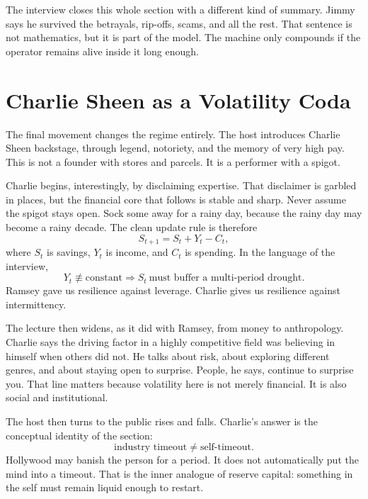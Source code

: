 The interview closes this whole section with a different kind of summary. Jimmy says he survived the betrayals, rip-offs, scams, and all the rest. That sentence is not mathematics, but it is part of the model. The machine only compounds if the operator remains alive inside it long enough.

\section{Charlie Sheen as a Volatility Coda}

The final movement changes the regime entirely. The host introduces Charlie Sheen backstage, through legend, notoriety, and the memory of very high pay. This is not a founder with stores and parcels. It is a performer with a spigot.

Charlie begins, interestingly, by disclaiming expertise. That disclaimer is garbled in places, but the financial core that follows is stable and sharp. Never assume the spigot stays open. Sock some away for a rainy day, because the rainy day may become a rainy decade. The clean update rule is therefore
\begin{equation}
S_{t+1}=S_t+Y_t-C_t,
\end{equation}
where \(S_t\) is savings, \(Y_t\) is income, and \(C_t\) is spending. In the language of the interview,
\begin{equation}
Y_t \not\equiv \text{constant} \Rightarrow S_t\ \text{must buffer a multi-period drought}.
\end{equation}
Ramsey gave us resilience against leverage. Charlie gives us resilience against intermittency.

The lecture then widens, as it did with Ramsey, from money to anthropology. Charlie says the driving factor in a highly competitive field was believing in himself when others did not. He talks about risk, about exploring different genres, and about staying open to surprise. People, he says, continue to surprise you. That line matters because volatility here is not merely financial. It is also social and institutional.

The host then turns to the public rises and falls. Charlie's answer is the conceptual identity of the section:
\begin{equation}
\text{industry timeout} \neq \text{self-timeout}.
\end{equation}
Hollywood may banish the person for a period. It does not automatically put the mind into a timeout. That is the inner analogue of reserve capital: something in the self must remain liquid enough to restart.

